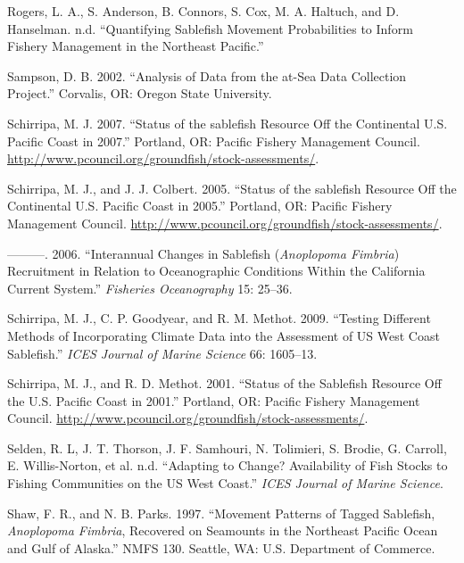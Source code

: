 \documentclass[11pt,
  english,
  a4paper,
]{article}
\newlength{\cslhangindent}
\newenvironment{cslreferences}%
  {\setlength{\parindent}{0pt}%
  \everypar{\setlength{\hangindent}{\cslhangindent}}\ignorespaces}%
  {\par}
\begin{document}
\begin{cslreferences}
\leavevmode\hypertarget{ref-rogers2020}{}%
Rogers, L. A., S. Anderson, B. Connors, S. Cox, M. A. Haltuch, and D. Hanselman. n.d. ``Quantifying Sablefish Movement Probabilities to Inform Fishery Management in the Northeast Pacific.''

\leavevmode\hypertarget{ref-sampson2002}{}%
Sampson, D. B. 2002. ``Analysis of Data from the at-Sea Data Collection Project.'' Corvalis, OR: Oregon State University.

\leavevmode\hypertarget{ref-schirripa2007sablefish}{}%
Schirripa, M. J. 2007. ``Status of the sablefish Resource Off the Continental U.S. Pacific Coast in 2007.'' Portland, OR: Pacific Fishery Management Council. \url{http://www.pcouncil.org/groundfish/stock-assessments/}.

\leavevmode\hypertarget{ref-schirripa2005sablefish}{}%
Schirripa, M. J., and J. J. Colbert. 2005. ``Status of the sablefish Resource Off the Continental U.S. Pacific Coast in 2005.'' Portland, OR: Pacific Fishery Management Council. \url{http://www.pcouncil.org/groundfish/stock-assessments/}.

\leavevmode\hypertarget{ref-schirripa2006}{}%
---------. 2006. ``Interannual Changes in Sablefish (\emph{Anoplopoma Fimbria}) Recruitment in Relation to Oceanographic Conditions Within the California Current System.'' \emph{Fisheries Oceanography} 15: 25--36.

\leavevmode\hypertarget{ref-schirripa2009icesjms}{}%
Schirripa, M. J., C. P. Goodyear, and R. M. Methot. 2009. ``Testing Different Methods of Incorporating Climate Data into the Assessment of US West Coast Sablefish.'' \emph{ICES Journal of Marine Science} 66: 1605--13.

\leavevmode\hypertarget{ref-schirripa2001sablefish}{}%
Schirripa, M. J., and R. D. Methot. 2001. ``Status of the Sablefish Resource Off the U.S. Pacific Coast in 2001.'' Portland, OR: Pacific Fishery Management Council. \url{http://www.pcouncil.org/groundfish/stock-assessments/}.

\leavevmode\hypertarget{ref-selden2020}{}%
Selden, R. L, J. T. Thorson, J. F. Samhouri, N. Tolimieri, S. Brodie, G. Carroll, E. Willis-Norton, et al. n.d. ``Adapting to Change? Availability of Fish Stocks to Fishing Communities on the US West Coast.'' \emph{ICES Journal of Marine Science}.

\leavevmode\hypertarget{ref-shaw1997}{}%
Shaw, F. R., and N. B. Parks. 1997. ``Movement Patterns of Tagged Sablefish, \emph{Anoplopoma Fimbria}, Recovered on Seamounts in the Northeast Pacific Ocean and Gulf of Alaska.'' NMFS 130. Seattle, WA: U.S. Department of Commerce.


\end{cslreferences}
\end{document}
